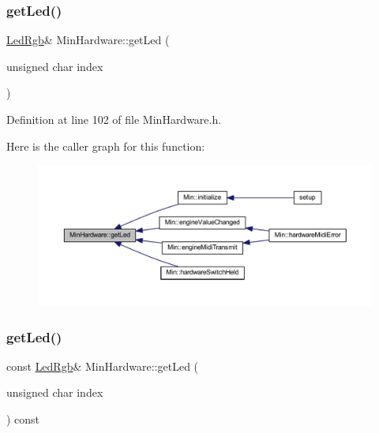 \subsubsection{\texorpdfstring{get\+Led()}{getLed()}\hspace{0.1cm}{\footnotesize\ttfamily [1/2]}}
{\footnotesize\ttfamily \hyperlink{class_led_rgb}{Led\+Rgb}\& Min\+Hardware\+::get\+Led (\begin{DoxyParamCaption}\item[{unsigned char}]{index }\end{DoxyParamCaption})\hspace{0.3cm}{\ttfamily [inline]}}



Definition at line 102 of file Min\+Hardware.\+h.

Here is the caller graph for this function\+:
\nopagebreak
\begin{figure}[H]
\begin{center}
\leavevmode
\includegraphics[width=350pt]{class_min_hardware_a1401ae874f57cc5ce31032c8eea57fbd_icgraph}
\end{center}
\end{figure}
\mbox{\label{class_min_hardware_af0f53594d24df7d75360ccccd0f582d3}} 
\subsubsection{\texorpdfstring{get\+Led()}{getLed()}\hspace{0.1cm}{\footnotesize\ttfamily [2/2]}}
{\footnotesize\ttfamily const \hyperlink{class_led_rgb}{Led\+Rgb}\& Min\+Hardware\+::get\+Led (\begin{DoxyParamCaption}\item[{unsigned char}]{index }\end{DoxyParamCaption}) const\hspace{0.3cm}{\ttfamily [inline]}}



